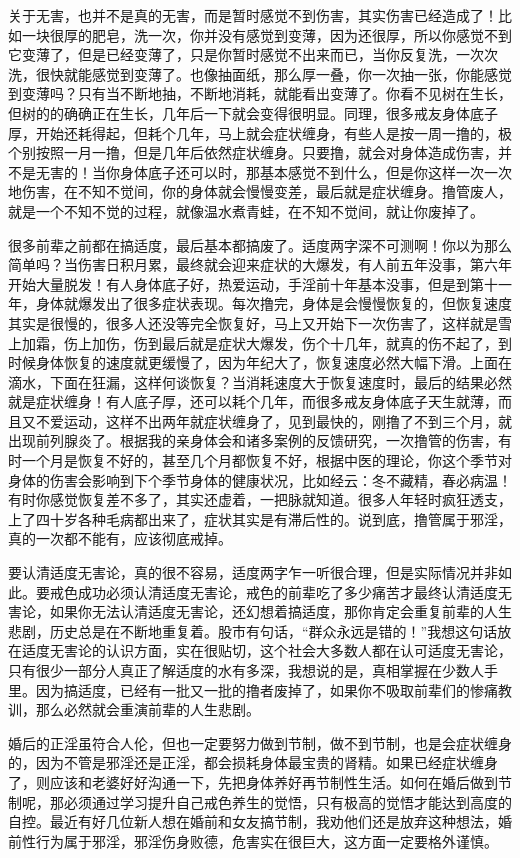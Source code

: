 \begin{case}
    关于无害，也并不是真的无害，而是暂时感觉不到伤害，其实伤害已经造成了！比如一块很厚的肥皂，洗一次，你并没有感觉到变薄，因为还很厚，所以你感觉不到它变薄了，但是已经变薄了，只是你暂时感觉不出来而已，当你反复洗，一次次洗，很快就能感觉到变薄了。也像抽面纸，那么厚一叠，你一次抽一张，你能感觉到变薄吗？只有当不断地抽，不断地消耗，就能看出变薄了。你看不见树在生长，但树的的确确正在生长，几年后一下就会变得很明显。同理，很多戒友身体底子厚，开始还耗得起，但耗个几年，马上就会症状缠身，有些人是按一周一撸的，极个别按照一月一撸，但是几年后依然症状缠身。只要撸，就会对身体造成伤害，并不是无害的！当你身体底子还可以时，那基本感觉不到什么，但是你这样一次一次地伤害，在不知不觉间，你的身体就会慢慢变差，最后就是症状缠身。撸管废人，就是一个不知不觉的过程，就像温水煮青蛙，在不知不觉间，就让你废掉了。

    很多前辈之前都在搞适度，最后基本都搞废了。适度两字深不可测啊！你以为那么简单吗？当伤害日积月累，最终就会迎来症状的大爆发，有人前五年没事，第六年开始大量脱发！有人身体底子好，热爱运动，手淫前十年基本没事，但是到第十一年，身体就爆发出了很多症状表现。每次撸完，身体是会慢慢恢复的，但恢复速度其实是很慢的，很多人还没等完全恢复好，马上又开始下一次伤害了，这样就是雪上加霜，伤上加伤，伤到最后就是症状大爆发，伤个十几年，就真的伤不起了，到时候身体恢复的速度就更缓慢了，因为年纪大了，恢复速度必然大幅下滑。上面在滴水，下面在狂漏，这样何谈恢复？当消耗速度大于恢复速度时，最后的结果必然就是症状缠身！有人底子厚，还可以耗个几年，而很多戒友身体底子天生就薄，而且又不爱运动，这样不出两年就症状缠身了，见到最快的，刚撸了不到三个月，就出现前列腺炎了。根据我的亲身体会和诸多案例的反馈研究，一次撸管的伤害，有时一个月是恢复不好的，甚至几个月都恢复不好，根据中医的理论，你这个季节对身体的伤害会影响到下个季节身体的健康状况，比如经云：冬不藏精，春必病温！有时你感觉恢复差不多了，其实还虚着，一把脉就知道。很多人年轻时疯狂透支，上了四十岁各种毛病都出来了，症状其实是有滞后性的。说到底，撸管属于邪淫，真的一次都不能有，应该彻底戒掉。

    要认清适度无害论，真的很不容易，适度两字乍一听很合理，但是实际情况并非如此。要戒色成功必须认清适度无害论，戒色的前辈吃了多少痛苦才最终认清适度无害论，如果你无法认清适度无害论，还幻想着搞适度，那你肯定会重复前辈的人生悲剧，历史总是在不断地重复着。股市有句话，“群众永远是错的！”我想这句话放在适度无害论的认识方面，实在很贴切，这个社会大多数人都在认可适度无害论，只有很少一部分人真正了解适度的水有多深，我想说的是，真相掌握在少数人手里。因为搞适度，已经有一批又一批的撸者废掉了，如果你不吸取前辈们的惨痛教训，那么必然就会重演前辈的人生悲剧。

    婚后的正淫虽符合人伦，但也一定要努力做到节制，做不到节制，也是会症状缠身的，因为不管是邪淫还是正淫，都会损耗身体最宝贵的肾精。如果已经症状缠身了，则应该和老婆好好沟通一下，先把身体养好再节制性生活。如何在婚后做到节制呢，那必须通过学习提升自己戒色养生的觉悟，只有极高的觉悟才能达到高度的自控。最近有好几位新人想在婚前和女友搞节制，我劝他们还是放弃这种想法，婚前性行为属于邪淫，邪淫伤身败德，危害实在很巨大，这方面一定要格外谨慎。
\end{case}

